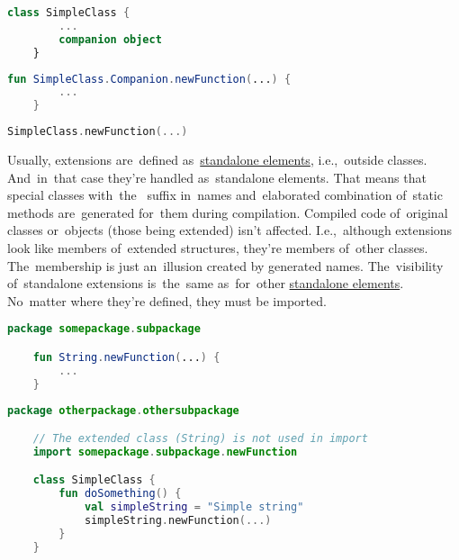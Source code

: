 \begin{lstlisting}[language=Kotlin, title={Class with a~companion object without a~body}]
    class SimpleClass {
        ...
        companion object
    }
\end{lstlisting}
\begin{lstlisting}[language=Kotlin, title={Companion object extension definition}]
    fun SimpleClass.Companion.newFunction(...) {
        ...
    }
\end{lstlisting}
\begin{lstlisting}[language=Kotlin, title={Usage}]
    SimpleClass.newFunction(...)
\end{lstlisting}

\label{kotlinextensionscope}
Usually, extensions are~defined as~\hyperref[kotlinstandalone]{standalone elements}, i.e.,~outside classes.
And~in~that case they're handled as~standalone elements.
That means that special classes \mbox{with the } suffix in~names and~elaborated combination of~static methods are~generated for~them during compilation.
Compiled code of~original classes or~objects (those being extended) isn't affected.
I.e.,~although extensions look like members of~extended structures, they're members of~other classes.
The~membership is just an~illusion created by generated names.
The~visibility of~standalone extensions is~the~same as~for~other \hyperref[kotlinstandalone]{standalone elements}.
No~matter where they're defined, they must be imported.
\newline

\begin{lstlisting}[language=Kotlin, title={Extension definition}]
    package somepackage.subpackage

    fun String.newFunction(...) {
        ...
    }
\end{lstlisting}
\newline

\begin{lstlisting}[language=Kotlin, title={Usage in a class}]
    package otherpackage.othersubpackage

    // The extended class (String) is not used in import
    import somepackage.subpackage.newFunction

    class SimpleClass {
        fun doSomething() {
            val simpleString = "Simple string"
            simpleString.newFunction(...)
        }
    }
\end{lstlisting}
\newline
\newline

